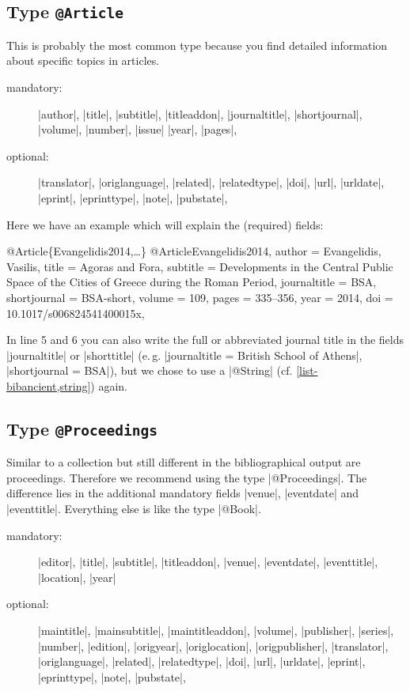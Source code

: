 \documentclass[a4paper,
10pt,
greek,
french,
spanish,
italian,
ngerman,
english,
]{ltxdoc}
\begin{document}
\subsection{Type \texttt{@Article}}\label{article}
 This is probably the most common type 
because you find detailed information about specific topics in articles.

\begin{description}
\item[mandatory:] 
|author|, |title|, |subtitle|, |titleaddon|,
|journaltitle|, |shortjournal|, |volume|, |number|, |issue|
|year|, |pages|, 
\item[optional:]
|translator|, |origlanguage|,
|related|, |relatedtype|,
|doi|, |url|, |urldate|, |eprint|, |eprinttype|, |note|, |pubstate|, 
 \end{description}

Here we have an example which will explain the (required)  fields:
\begin{bibexample}[label=Evangelidis2014]{{@}Article\{Evangelidis2014,…\}}
@Article{Evangelidis2014,
  author       = {Evangelidis, Vasilis},
  title        = {Agoras {and} Fora},
  subtitle     = {Developments in the Central Public Space of the Cities of Greece during the {Roman} Period},
  journaltitle = BSA,    %
  shortjournal = BSA-short,    %
  volume       = {109},
  pages        = {335--356},
  year         = {2014},
  doi          = {10.1017/s006824541400015x},
}
\end{bibexample}
In line 5 and 6 you can also write the full or abbreviated journal title in the fields |journaltitle| or |shorttitle| (e.\,g. |journaltitle = {British School of Athens}|, |shortjournal = {BSA}|), but we chose to use a |@String| (cf. \cref{list-bibancient,string}) again.


\subsection{Type \texttt{@Proceedings}}\label{proceedings}
Similar to a collection but still different in the bibliographical output are proceedings.
Therefore we recommend  using the type |@Proceedings|.
The difference lies in the additional mandatory fields |venue|, |eventdate| and |eventtitle|. 
Everything else is like the type |@Book|.

\begin{description}
\item[mandatory:] 
|editor|, 
|title|, |subtitle|, |titleaddon|,
|venue|, |eventdate|, |eventtitle|,
|location|, |year|
\item[optional:]
|maintitle|, |mainsubtitle|, |maintitleaddon|, |volume|, 
|publisher|, |series|, |number|, |edition|, 
|origyear|, |origlocation|, |origpublisher|, 
|translator|, |origlanguage|,
|related|, |relatedtype|,
|doi|, |url|, |urldate|, |eprint|, |eprinttype|, |note|, |pubstate|, 
 \end{description}
 
\end{document}

